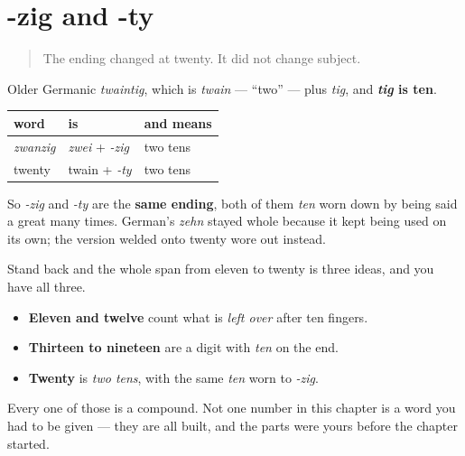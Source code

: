 \section[-zig und -ty]{-zig and -ty}

\label{lesson:GE-C12-zwanzig-zwei-zehn}



\begin{quote}
The ending changed at twenty. It did not change subject.
\end{quote}

\begin{cousinweb}
Older Germanic \emph{twaintig}, which is \emph{twain} — \textquotedblleft{}two\textquotedblright{} — plus \emph{tig}, and \textbf{\emph{tig} is ten}.

\noindent
\begin{tabularx}{\linewidth}{@{}>{\raggedright\arraybackslash}X>{\raggedright\arraybackslash}X>{\raggedright\arraybackslash}X@{}}
\toprule
\textbf{word} & \textbf{is} & \textbf{and means} \\
\midrule
\emph{zwanzig} & \emph{zwei} + \emph{-zig} & two tens \\
twenty & twain + \emph{-ty} & two tens \\
\bottomrule
\end{tabularx}

So \emph{-zig} and \emph{-ty} are the \textbf{same ending}, both of them \emph{ten} worn down by being said a great many times. German's \emph{zehn} stayed whole because it kept being used on its own; the version welded onto twenty wore out instead.
\end{cousinweb}

\begin{culture}
Stand back and the whole span from eleven to twenty is three ideas, and you have all three.

\begin{itemize}
\raggedright
  \item \textbf{Eleven and twelve} count what is \emph{left over} after ten fingers.
  \item \textbf{Thirteen to nineteen} are a digit with \emph{ten} on the end.
  \item \textbf{Twenty} is \emph{two tens}, with the same \emph{ten} worn to \emph{-zig}.
\end{itemize}

Every one of those is a compound. Not one number in this chapter is a word you had to be given — they are all built, and the parts were yours before the chapter started.
\end{culture}

